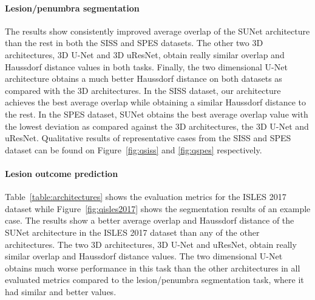 \documentclass[letterpaper,final,authoryear,3p,times,twocolumn]{elsarticle}
\begin{document}
\paragraph{Lesion/penumbra segmentation} The results show consistently improved average overlap of the SUNet architecture than the rest in both the SISS and SPES datasets. The other two 3D architectures, 3D U-Net and 3D uResNet, obtain really similar overlap and Haussdorf distance values in both tasks. Finally, the two dimensional U-Net architecture obtains a much better Haussdorf distance on both datasets as compared with the 3D architectures. In the SISS dataset, our architecture achieves the best average overlap while obtaining a similar Haussdorf distance to the rest. In the SPES dataset, SUNet obtains the best average overlap value with the lowest deviation as compared against the 3D architectures, the 3D U-Net and uResNet. Qualitative results of representative cases from the SISS and SPES dataset can be found on Figure~\ref{fig:qsiss} and \ref{fig:qspes} respectively.



\paragraph{Lesion outcome prediction} Table~\ref{table:architectures} shows the evaluation metrics for the ISLES 2017 dataset while Figure~\ref{fig:qisles2017} shows the segmentation results of an example case. The results show a better average overlap and Haussdorf distance of the SUNet architecture in the ISLES 2017 dataset than any of the other architectures. The two 3D architectures, 3D U-Net and uResNet, obtain really similar overlap and Haussdorf distance values. The two dimensional U-Net obtains much worse performance in this task than the other architectures in all evaluated metrics compared to the lesion/penumbra segmentation task, where it had similar and better values.
\end{document}
